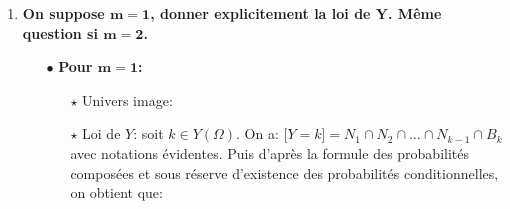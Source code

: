 \documentclass[a4paper, 11pt,reqno]{article}
\begin{document}
\begin{correction}
\begin{enumerate}
\begin{itemize}
			      \item[$\bullet$] On obtient donc $P(\lbrack Y=k\rbrack)=P(\lbrack X_{k-1}=m-1\rbrack\cap B_k)$. Puis d'apr\`{e}s la formule des probabilit\'es compos\'ees, on obtient que: $P(\lbrack Y=k\rbrack)=P(\lbrack X_{k-1}=m-1\rbrack)P_{\lbrack X_{k-1}=m-1\rbrack}( B_k)$ car $P(\lbrack X_{k-1}=m-1\rbrack)\not= 0$ d'apr\`{e}s la question 1 et ainsi la probabilit\'e conditionnelle $P_{\lbrack X_{k-1}=m-1\rbrack}$ existe bien. On a toujours d'apr\`{e}s la question 1 que $P(\lbrack X_{k-1}=m-1\rbrack)=\ddp\frac{  \binom{m}{m-1}  \binom{n-m}{k-m} }{  \binom{n}{k-1}  }=m\ddp\frac{\binom{n-m}{k-m}}{ \binom{n}{k-1} }$. Il reste donc \`{a} calculer $P_{\lbrack X_{k-1}=m-1\rbrack}( B_k)$. Lors du $k$-i\`{e}me tirage il reste dans l'urne 1 boule blanche et $n-k+1$ boules en tout. Ainsi on a:
				      $P_{\lbrack X_{k-1}=m-1\rbrack}( B_k)=\ddp\frac{1}{n-k+1}$. Au final on a donc obtenu que:
				      $$\fbox{$\forall k\in Y(\Omega),\ P(\lbrack Y=k\rbrack)=P(\lbrack X_{k-1}=m-1\rbrack)P_{\lbrack X_{k-1}=m-1\rbrack}( B_k)=\ddp\frac{m}{n-k+1}\ddp\frac{\binom{n-m}{k-m}}{ \binom{n}{k-1} }.$}$$
			      \item[$\bullet$] Il reste alors \`{a} v\'erifier que l'on retrouve bien le m\^{e}me r\'esultat que dans la question pr\'ec\'edente. Pour cela on \'ecrit les deux coefficients binomiaux sous la forme de factorielle et on obtient que:
				      $$\hspace{-1.5cm} \ddp\frac{m}{n-k+1}\ddp\frac{\binom{n-m}{k-m}}{ \binom{n}{k-1} }=\ddp\frac{m}{n-k+1}\ddp\frac{(n-m)!}{(k-m)!(n-k)!}\ddp\frac{(k-1)!(n-k+1)!}{n!}=m \ddp\frac{(n-m)!(k-1)!(n-k)!}{n!(k-m)!(n-k)!}=m \ddp\frac{(n-m)!(k-1)!}{n!(k-m)!}.$$
				      On retrouve bien le m\^{e}me r\'esultat que dans la question 2.
		      \end{itemize}
		\item \textbf{On suppose $\mathbf{m=1}$, donner explicitement la loi de $\mathbf{Y}$. M\^eme question si $\mathbf{m=2}$.}
		      \begin{itemize}
			      \item[$\bullet$] \textbf{Pour $\mathbf{m=1}$:}
				      \begin{itemize}
					      \item[$\star$] Univers image: 
					      \item[$\star$] Loi de $Y$: soit $k\in Y(\Omega)$. On a: $\lbrack Y=k\rbrack=N_1\cap N_2\cap \dots \cap N_{k-1}\cap B_k$ avec notations \'evidentes. Puis d'apr\`{e}s la formule des probabilit\'es compos\'ees et sous r\'eserve d'existence des probabilit\'es conditionnelles, on obtient que:

\end{itemize}
\end{itemize}
\end{enumerate}
\end{correction}
\end{document}
